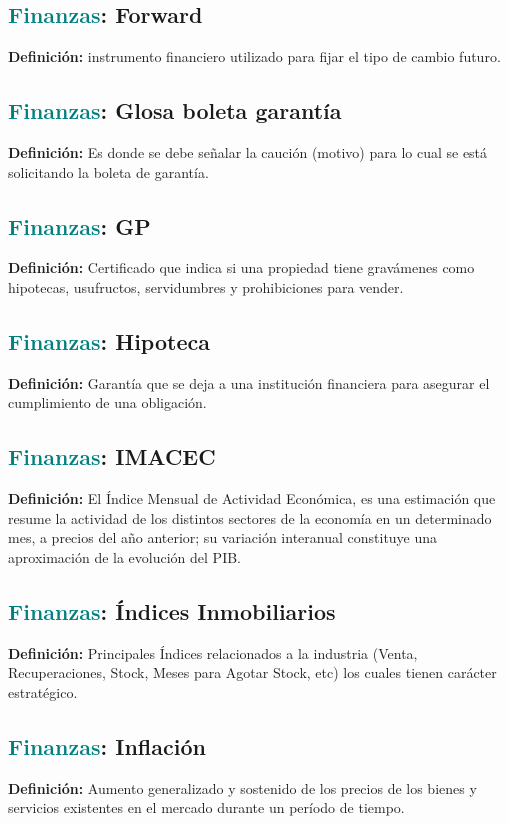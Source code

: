 \documentclass[12pt]{article}
\begin{document}
\subsection{\textcolor{teal}{Finanzas}: Forward}
\textbf{Definición:} instrumento financiero utilizado para fijar el tipo de cambio futuro.
\subsection{\textcolor{teal}{Finanzas}: Glosa boleta garantía}
\textbf{Definición:} Es donde se debe señalar la caución (motivo) para lo cual se está solicitando la boleta de garantía.
\subsection{\textcolor{teal}{Finanzas}: GP}
\textbf{Definición:} Certificado que indica si una propiedad tiene gravámenes como hipotecas, usufructos, servidumbres y prohibiciones para vender.
\subsection{\textcolor{teal}{Finanzas}: Hipoteca}
\textbf{Definición:} Garantía que se deja a una institución financiera para asegurar el cumplimiento de una obligación.
\subsection{\textcolor{teal}{Finanzas}: IMACEC}
\textbf{Definición:} El Índice Mensual de Actividad Económica, es una estimación que resume la actividad de los distintos sectores de la economía en un determinado mes, a precios del año anterior; su variación interanual constituye una aproximación de la evolución del PIB.
\subsection{\textcolor{teal}{Finanzas}: Índices Inmobiliarios}
\textbf{Definición:} Principales Índices relacionados a la industria (Venta, Recuperaciones, Stock, Meses para Agotar Stock, etc) los cuales tienen carácter estratégico.
\subsection{\textcolor{teal}{Finanzas}: Inflación}
\textbf{Definición:} Aumento generalizado y sostenido de los precios de los bienes y servicios existentes en el mercado durante un período de tiempo.
\end{document}
